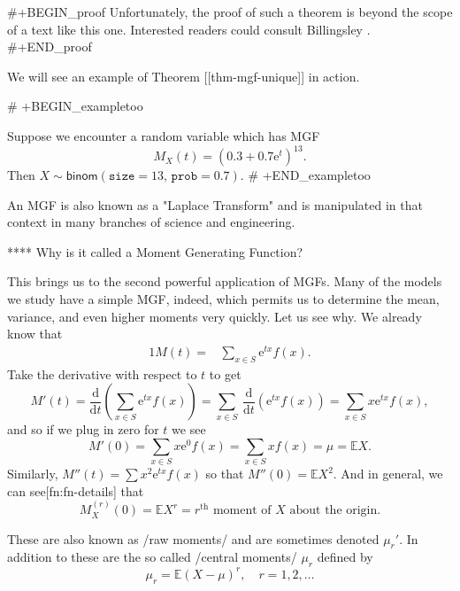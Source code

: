 #+BEGIN_proof
Unfortunately, the proof of such a theorem is beyond the scope of a
text like this one. Interested readers could consult Billingsley
\cite{Billingsley1995}.
#+END_proof


We will see an example of Theorem [[thm-mgf-unique]] in action.

# +BEGIN_exampletoo

Suppose we encounter a random variable which has MGF
\[
M_{X}(t)=(0.3+0.7\mathrm{e}^{t})^{13}.
\]
Then \(X\sim\mathsf{binom}(\mathtt{size}=13,\,\mathtt{prob}=0.7)\).
# +END_exampletoo

An MGF is also known as a "Laplace Transform" and is manipulated in
that context in many branches of science and engineering.

**** Why is it called a Moment Generating Function?

This brings us to the second powerful application of MGFs. Many of the
models we study have a simple MGF, indeed, which permits us to
determine the mean, variance, and even higher moments very
quickly. Let us see why. We already know that
\begin{alignat*}{1}
M(t)= & \sum_{x\in S}\mathrm{e}^{tx}f(x).
\end{alignat*}
Take the derivative with respect to \(t\) to get
\begin{equation}
M'(t)=\frac{\mathrm{d}}{\mathrm{d} t}\left(\sum_{x\in S}\mathrm{e}^{tx}f(x)\right)=\sum_{x\in S}\ \frac{\mathrm{d}}{\mathrm{d} t}\left(\mathrm{e}^{tx}f(x)\right)=\sum_{x\in S}x\mathrm{e}^{tx}f(x),
\end{equation}
and so if we plug in zero for \(t\) we see
\begin{equation}
M'(0)=\sum_{x\in S}x\mathrm{e}^{0}f(x)=\sum_{x\in S}xf(x)=\mu=\mathbb{E} X.
\end{equation}
Similarly, \(M''(t) = \sum x^{2} \mathrm{e}^{tx} f(x) \) so that
\(M''(0) = \mathbb{E} X^{2}\). And in general, we can
see[fn:fn-details] that
\begin{equation}
M_{X}^{(r)}(0)=\mathbb{E} X^{r}=\mbox{\(r^{\mathrm{th}}\) moment of \(X\) about the origin.}
\end{equation}

These are also known as /raw moments/ and are sometimes denoted
\(\mu_{r}'\). In addition to these are the so called /central moments/
\(\mu_{r}\) defined by
\begin{equation}
\mu_{r}=\mathbb{E}(X-\mu)^{r},\quad r=1,2,\ldots
\end{equation}

